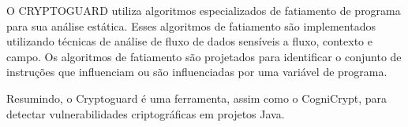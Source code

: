 O CRYPTOGUARD utiliza algoritmos especializados de fatiamento de programa para sua análise estática. Esses algoritmos de fatiamento são implementados utilizando técnicas de análise de fluxo de dados sensíveis a fluxo, contexto e campo. Os algoritmos de fatiamento são projetados para identificar o conjunto de instruções que influenciam ou são influenciadas por uma variável de programa. \cite{CryptoGuard}








Resumindo, o Cryptoguard é uma ferramenta, assim como o CogniCrypt, para detectar vulnerabilidades criptográficas em projetos Java. 


